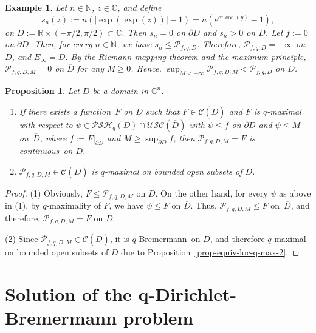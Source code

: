 \documentclass[10pt,a4paper]{amsart}
\newtheorem{prop}[thm]{Proposition}
\newtheorem{ex}[thm]{Example}
\numberwithin{equation}{section}
\newcommand{\nbb}{\mathbb{N}}
\newcommand{\cbb}{\mathbb{C}}
\newcommand{\rbb}{\mathbb{R}}
\newcommand{\ccal}{\mathcal{C}}
\newcommand{\pcal}{\mathcal{P}}
\newcommand{\USC}{\mathcal{USC}}
\newcommand{\qbrem}{$q$-Bremermann}
\newcommand{\PSH}{\mathcal{PSH}}
\newcommand{\cont}{continuous}
\newcommand{\fct}{function}
\newcommand{\cld}{\overline{D}}
\begin{document}
\begin{ex} Let $n \in \nbb$, $z \in \cbb$, and define
\[
s_n(z):=n(|\exp(\exp(z))|-1)=n(e^{e^x\cos(y)}-1),
\]
on $D:=\rbb\times(-\pi/2,\pi/2) \subset \cbb$. Then $s_n=0$ on $\partial D$ and $s_n>0$ on $D$. Let $f:=0$ on $\partial D$. Then, for every $n \in \nbb$, we have $s_n \leq \pcal_{f,q,D}$. Therefore, $\pcal_{f,q,D}=+\infty$ on $D$, and $E_\infty=D$. By the Riemann mapping theorem and the maximum principle, $\pcal_{f,q,D,M}=0$ on $\cld$ for any $M \geq 0$. Hence, $\sup_{M<+\infty}\pcal_{f,q,D,M} < \pcal_{f,q,D}$ on $D$. 
\end{ex}


\begin{prop}\label{prop-q-Perron-q-max} Let $D$ be a domain in $\cbb^n$.

\begin{enumerate}

\item If there exists a \fct\ $F$ on $\cld$ such that $F \in \ccal(\cld)$ and $F$ is $q$-maximal with respect to $\psi \in \PSH_q(D)\cap\USC(\cld)$ with $\psi \leq f$ on $\partial D$ and $\psi \leq M$ on~$\cld$, where $f:=F|_{\partial D}$ and $M\geq\sup_{\partial D} f$, then $\pcal_{f,q,D,M} = F$ is \cont\ on $\cld$.

\item $\pcal_{f,q,D,M} \in \ccal(\cld)$ is $q$-maximal on bounded open subsets of $D$. 
\end{enumerate}

\end{prop}

\begin{proof} (1) Obviously, $F\leq \pcal_{f,q,D,M}$ on $\cld$. On the other hand, for every $\psi$ as above in (1), by $q$-maximality of $F$, we have $\psi \leq F$ on $\cld$. Thus, $\pcal_{f,q,D,M} \leq F$ on~$\cld$, and therefore, $\pcal_{f,q,D,M} = F$ on $\cld$.

(2) Since $\pcal_{f,q,D,M} \in \ccal(\cld)$, it is \qbrem\ on $\cld$, and therefore $q$-maximal on bounded open subsets of $D$ due to Proposition~\ref{prop-equiv-loc-q-max-2}.
\end{proof}







\section{Solution of the q-Dirichlet-Bremermann problem}
\end{document}
